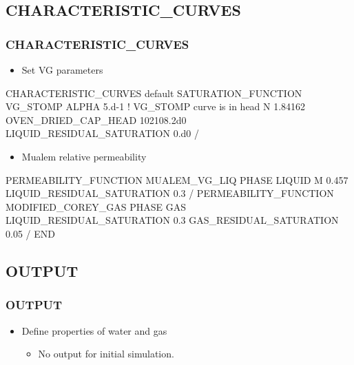 \documentclass{beamer}
\newcommand\bluecomment[1]{{{\color{blue} #1}}}
\begin{document}
\subsection{CHARACTERISTIC\_CURVES}

\begin{frame}\frametitle{CHARACTERISTIC\_CURVES}

\begin{itemize}
\item Set VG parameters
\end{itemize}

\begin{semiverbatim}
CHARACTERISTIC_CURVES default
  SATURATION_FUNCTION VG_STOMP
    ALPHA 5.d-1 \bluecomment{! VG_STOMP curve is in head}
    N 1.84162
    OVEN_DRIED_CAP_HEAD 102108.2d0
    LIQUID_RESIDUAL_SATURATION 0.d0
  /
\end{semiverbatim}

\newpage
\begin{itemize}
\item Mualem relative permeability
\end{itemize}

\begin{semiverbatim}
  PERMEABILITY_FUNCTION MUALEM_VG_LIQ
    PHASE LIQUID
    M 0.457
    LIQUID_RESIDUAL_SATURATION 0.3
  /
  PERMEABILITY_FUNCTION MODIFIED_COREY_GAS
    PHASE GAS
    LIQUID_RESIDUAL_SATURATION 0.3
    GAS_RESIDUAL_SATURATION 0.05
  /
END
\end{semiverbatim}

\end{frame}

\subsection{OUTPUT}

\begin{frame}[fragile]\frametitle{OUTPUT}

\begin{itemize}
  \item Define properties of water and gas
  \begin{itemize}
    \item No output for initial simulation.
  \end{itemize}
\end{itemize}

\end{frame}
\end{document}
